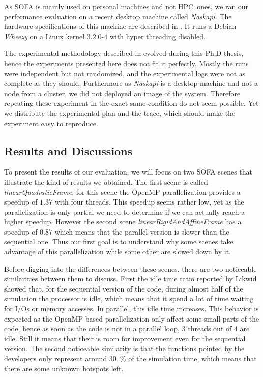 As \gls{SOFA} is mainly used on personal machines and not \gls{HPC} ones, we ran our performance evaluation on a recent desktop machine called \emph{Naskapi}.
The hardware specifications of this machine are described in .
It runs a \gls{Debian} \emph{Wheezy} on a Linux kernel $3.2.0$-$4$ with hyper threading disabled.


The experimental methodology described in  evolved during this Ph.D thesis, hence the experiments presented here does not fit it perfectly.
Mostly the runs were independent but not randomized, and the experimental logs were not as complete as they should.
Furthermore as \emph{Naskapi} is a desktop machine and not a node from a cluster, we did not deployed an image of the system.
Therefore repeating these experiment in the exact same condition do not seem possible.
Yet we distribute the experimental plan and the trace, which should make the experiment easy to reproduce.


\subsection{Results and Discussions}

To present the results of our evaluation, we will focus on two \gls{SOFA} scenes that illustrate the kind of results we obtained.
The first scene is called \emph{linearQuadraticFrame}, for this scene the \gls{OpenMP} parallelization provides a speedup of $1.37$ with four threads.
This speedup seems rather low, yet as the parallelization is only partial we need to determine if we can actually reach a higher speedup.
However the second scene \emph{linearRigidAndAffineFrame} has a speedup of $0.87$ which means that the parallel version is slower than the sequential one.
Thus our first goal is to understand why some scenes take advantage of this parallelization while some other are slowed down by it.

Before digging into the differences between these scenes, there are two noticeable similarities between them to discuss.
First the idle time ratio reported by \gls{Likwid} showed that, for the sequential version of the code, during almost half of the simulation the processor is idle, which means that it spend a lot of time waiting for \glspl{I/O} or memory accesses.
In parallel,  this idle time increases.
This behavior is expected as the \gls{OpenMP} based parallelization only affect some small parts of the code, hence as soon as the code is not in a parallel loop, $3$ threads out of $4$ are idle.
Still it means that their is room for improvement even for the sequential version.
The second noticeable similarity is that the functions pointed by the developers only represent around \SI{30}{\%} of the simulation time, which means that there are some unknown hotspots left.

